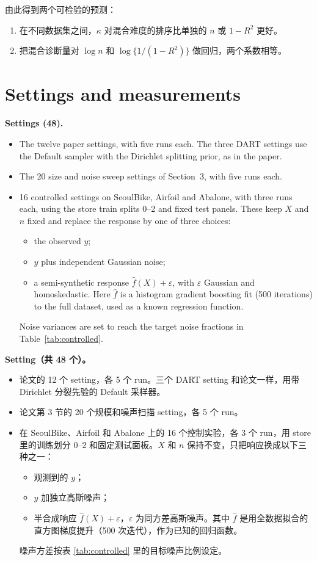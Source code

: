 \documentclass[11pt]{article}
\newcommand{\zhfont}{}
\begin{document}
\begin{zhbox}
由此得到两个可检验的预测：
\begin{enumerate}
\item 在不同数据集之间，$\kappa$ 对混合难度的排序比单独的 $n$ 或 $1-R^2$ 更好。
\item 把混合诊断量对 $\log n$ 和 $\log\{1/(1-R^2)\}$ 做回归，两个系数相等。
\end{enumerate}
\end{zhbox}


\section{Settings and measurements\quad{\zhfont 设置与度量}}


\textbf{Settings (48).}
\begin{itemize}
\item The twelve paper settings, with five runs each. The three DART settings use the Default sampler with the Dirichlet splitting prior, as in the paper.
\item The 20 size and noise sweep settings of Section~3, with five runs each.
\item 16 controlled settings on SeoulBike, Airfoil and Abalone, with three runs each, using the store train splits 0--2 and fixed test panels. These keep $X$ and $n$ fixed and replace the response by one of three choices:
\begin{itemize}
\item the observed $y$;
\item $y$ plus independent Gaussian noise;
\item a semi-synthetic response $\hat f(X)+\varepsilon$, with $\varepsilon$ Gaussian and homoskedastic. Here $\hat f$ is a histogram gradient boosting fit (500 iterations) to the full dataset, used as a known regression function.
\end{itemize}
Noise variances are set to reach the target noise fractions in Table~\ref{tab:controlled}.
\end{itemize}

\begin{zhbox}
\textbf{Setting（共 48 个）。}
\begin{itemize}
\item 论文的 12 个 setting，各 5 个 run。三个 DART setting 和论文一样，用带 Dirichlet 分裂先验的 Default 采样器。
\item 论文第 3 节的 20 个规模和噪声扫描 setting，各 5 个 run。
\item 在 SeoulBike、Airfoil 和 Abalone 上的 16 个控制实验，各 3 个 run，用 store 里的训练划分 0--2 和固定测试面板。$X$ 和 $n$ 保持不变，只把响应换成以下三种之一：
\begin{itemize}
\item 观测到的 $y$；
\item $y$ 加独立高斯噪声；
\item 半合成响应 $\hat f(X)+\varepsilon$，$\varepsilon$ 为同方差高斯噪声。其中 $\hat f$ 是用全数据拟合的直方图梯度提升（500 次迭代），作为已知的回归函数。
\end{itemize}
噪声方差按表 \ref{tab:controlled} 里的目标噪声比例设定。
\end{itemize}
\end{zhbox}
\end{document}
